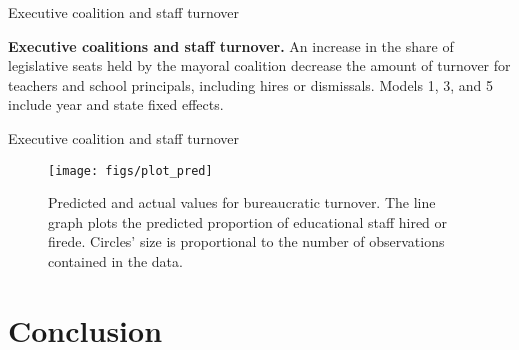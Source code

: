 \documentclass[ignorenonframetext,]{beamer}
\begin{document}
\begin{frame}{Executive coalition and staff turnover}
\protect\hypertarget{executive-coalition-and-staff-turnover}{}

\begin{table}[t]
  \centering
  \resizebox*{!}{\height}{%
  }
  \caption{{\bf Executive coalitions and staff turnover.} An increase in the share of legislative seats held by the mayoral coalition decrease the amount of turnover for teachers and school principals, including hires or dismissals. Models 1, 3, and 5 include year and state fixed effects.}
  \label{tbl:turnover}
\end{table}

\end{frame}

\begin{frame}{Executive coalition and staff turnover}
\protect\hypertarget{executive-coalition-and-staff-turnover-1}{}

\begin{figure}

{\centering \texttt{[image: figs/plot\_pred]} 

}

\caption{Predicted and actual values for bureaucratic turnover. The line graph plots the predicted proportion of educational staff hired or firede. Circles' size is proportional to the number of observations contained in the data.}\label{fig:unnamed-chunk-6}
\end{figure}

\end{frame}

\hypertarget{conclusion}{%
\section{Conclusion}\label{conclusion}}
\end{document}
